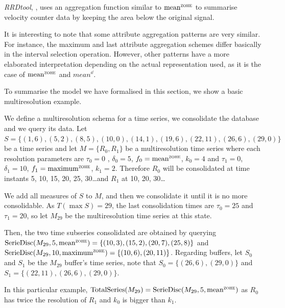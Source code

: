 \emph{RRDtool}, \cite{rrdtool}, uses an aggregation function similar
to $\meanz$ to summarise velocity counter data by keeping the area
below the original signal.

It is interesting to note that some attribute aggregation patterns are
very similar. For instance, the maximum and last attribute aggregation
schemes differ basically in the interval selection operation. However,
other patterns have a more elaborated interpretation depending on the
actual representation used, as it is the case of $\meanz$ and
$mean^\dd$.


To summarise the model we have formalised in this section, we show a
basic multiresolution example.
\begin{example}\label{ex:model:smultiresolution}
  We define a multiresolution schema for a time series, we consolidate
  the database and we query its data.  Let $S = \{
  (1,6),(5,2),\allowbreak (8,5),\allowbreak (10,0),\allowbreak
  (14,1),\allowbreak (19,6),\allowbreak (22,11),\allowbreak
  (26,6),(29,0) \}$ be a time series and let $M=\{R_0,R_1\}$ be a
  multiresolution time series where each resolution parameters are
  $\tau_0=0$ , $\delta_0=5$, $f_0 =\meanz$, $k_0=4$ and $\tau_1=0$,
  $\delta_1=10$, $f_1 =\maxz$, $k_1=2$. Therefore $R_0$ will be
  consolidated at time instants 5, 10, 15, 20, 25, 30\dots and $R_1$
  at 10, 20, 30\dots

  We add all measures of $S$ to $M$, and then we consolidate it until
  it is no more consolidable. As $T(\max S)=29$, the last
  consolidation times are $\tau_0=25$ and $\tau_1=20$, so let $M_{29}$
  be the multiresolution time series at this state.

  Then, the two time subseries consolidated are obtained by querying
  $\seriedisc(M_{29},5,\allowbreak \meanz)=\{\allowbreak
  (10,3),\allowbreak (15,\allowbreak 2),\allowbreak (20,7),\allowbreak
  (25,8)\}$ and $\seriedisc(M_{29},\allowbreak 10,\allowbreak \maxz)
  =\allowbreak \{ \allowbreak (10,6),\allowbreak (20,11)\}$. Regarding
  buffers, let $S_0$ and $S_1$ be the $M_{29}$ buffer's time series,
  note that $S_0= \{\allowbreak (26,6),\allowbreak (29,0)\allowbreak
  \}$ and $S_1=\{\allowbreak (22,11),\allowbreak (26,6),(29,0)\}$.

  In this particular example, $ \totalseries(M_{29}) =
  \seriedisc(M_{29},\allowbreak 5,\meanz)$ as $R_0$ has twice the
  resolution of $R_1$ and $k_0$ is bigger than $k_1$.
\end{example}

